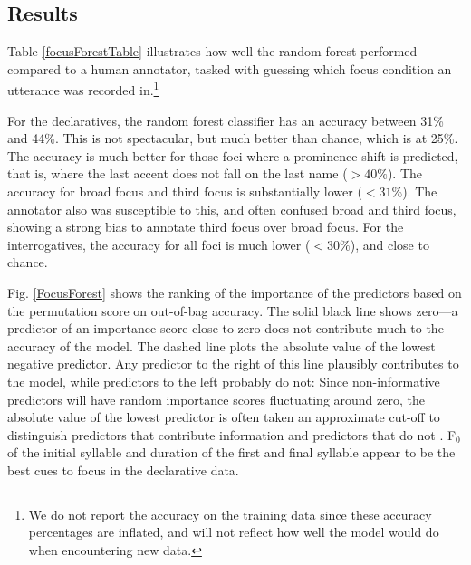\documentclass[preprint,review,12pt,authoryear,times]{elsarticle}
\begin{document}
\subsection{Results}

Table \ref{focusForestTable} illustrates how well the random forest performed compared to a human annotator, tasked with guessing which focus condition an utterance was recorded in.\footnote{We do not report the accuracy on the training data since these accuracy percentages are inflated, and will not reflect how well the model would do when encountering new data. %
}



For the declaratives, the random forest classifier has an accuracy between  31\%  and 44\%. This is not spectacular, but much better than chance, which is at 25\%. The accuracy is much better for those foci where a prominence shift is predicted, that is, where the last accent does not fall on the last name ($>40\%$). The accuracy for broad focus and third focus is substantially lower ($<31\%$). The annotator also was susceptible to this, and often confused broad and third focus, showing a strong bias to annotate third focus over broad focus.  For the interrogatives, the accuracy for all foci is much lower ($<30\%$), and close to chance. 

Fig. \ref{FocusForest} shows the ranking of the importance of the predictors based on the permutation score on out-of-bag accuracy. The solid black line shows zero---a predictor of an importance score close to zero does not contribute much to the accuracy of the model. The dashed line plots the absolute value of the lowest negative predictor. Any predictor to the right of this line plausibly contributes to the model, while predictors to the left probably do not: Since non-informative predictors will have random importance scores fluctuating around zero, the absolute value of the lowest predictor is often taken an approximate cut-off  to distinguish predictors that contribute information and predictors that do not \citep{strob09}. F$_0$ of the initial syllable and duration of the first and final syllable appear to be the best cues to focus in the declarative data. 
\end{document}
